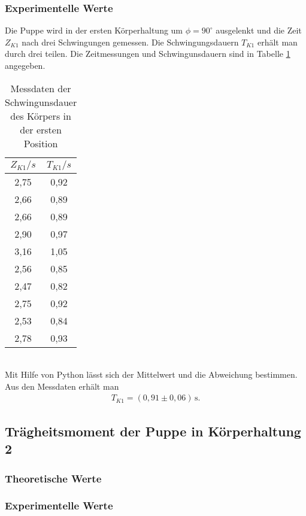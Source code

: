 \subsubsection{Experimentelle Werte}
Die Puppe wird in der ersten Körperhaltung um $\phi = 90^{\circ}$ ausgelenkt und die Zeit $Z_{K1}$ nach drei
Schwingungen gemessen. Die Schwingungsdauern $T_{K1}$ erhält man durch drei teilen. Die Zeitmessungen und
Schwingunsdauern sind in Tabelle \ref{tab:Koerper1} angegeben.
\begin{table}
  \centering
  \caption{Messdaten der Schwingunsdauer des Körpers in der ersten Position}
  \label{tab:Koerper1}
  \begin{tabular}{c c}
    \toprule
    $Z_{K1}/s$ & $T_{K1}/s$ \\
    \midrule
    2,75 & 0,92 \\
    2,66 & 0,89 \\
    2,66 & 0,89 \\
    2,90 & 0,97 \\
    3,16 & 1,05 \\
    2,56 & 0,85 \\
    2,47 & 0,82 \\
    2,75 & 0,92 \\
    2,53 & 0,84 \\
    2,78 & 0,93 \\
    \bottomrule
  \end{tabular}
\end{table}
\\
Mit Hilfe von Python lässt sich der Mittelwert und die Abweichung bestimmen. Aus den Messdaten
erhält man
\begin{align*}
  T_{K1} = (0{,}91 \pm 0{,}06)\, \mathrm{s} .
\end{align*}
\subsection{Trägheitsmoment der Puppe in Körperhaltung 2}
\subsubsection{Theoretische Werte}

\subsubsection{Experimentelle Werte}

